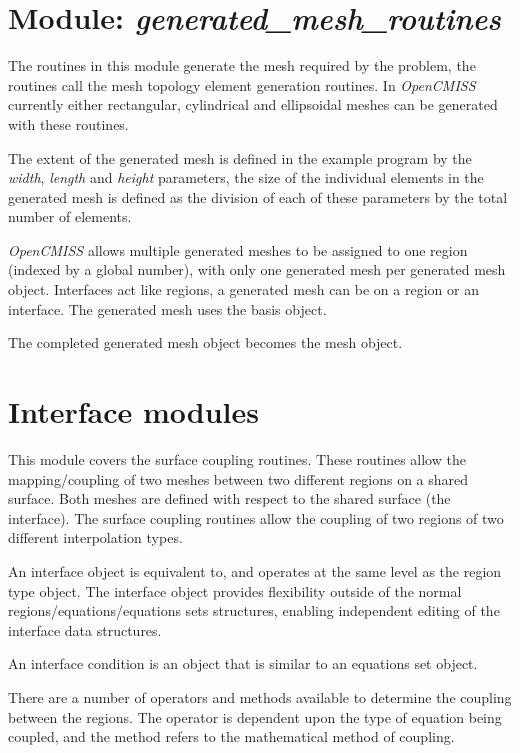 \section{Module: \emph{generated\_mesh\_routines}}
\label{sec:generatedmeshroutines}

The routines in this module generate the mesh required by the problem, the 
routines call the mesh topology element generation routines. In 
\emph{OpenCMISS} currently either rectangular, cylindrical and ellipsoidal 
meshes can be generated with these routines.

The extent of the generated mesh is defined in the example program by the 
\emph{width}, \emph{length} and \emph{height} parameters, the size of the 
individual elements in the generated mesh is defined as the division of each 
of these parameters by the total number of elements.

\emph{OpenCMISS} allows multiple generated meshes to be assigned to one region 
(indexed by a global number), with only one generated mesh per generated mesh 
object. Interfaces act like regions, a generated mesh can be on a region or an
interface. The generated mesh uses the basis object.

The completed generated mesh object becomes the mesh object.


\section{Interface modules}
\label{sec:interfacemodules}

This module covers the surface coupling routines. These routines allow the 
mapping/coupling of two meshes between two different regions on a shared
surface. Both meshes are defined with respect to the shared surface (the 
interface). The surface coupling routines allow the coupling of two regions 
of two different interpolation types. 

An interface object is equivalent to, and operates at the same level as 
the region type object. The interface object provides flexibility outside 
of the normal regions/equations/equations sets structures, enabling 
independent editing of the interface data structures.

An interface condition is an object that is similar to an equations set 
object. 

There are a number of operators and methods available to determine the 
coupling between the regions. The operator is dependent upon the type of 
equation being coupled, and the method refers to the mathematical method of 
coupling.

